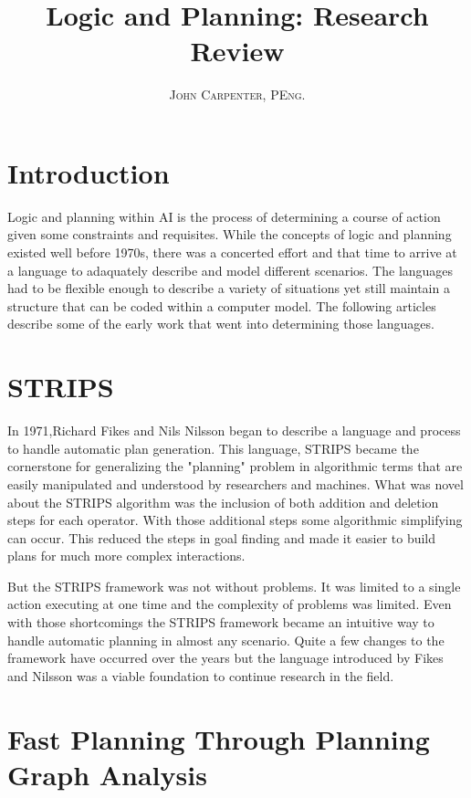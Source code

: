 \documentclass[paper=letter, fontsize=12pt]{article}
\title{\vspace{-15mm}\fontsize{24pt}{10pt}\selectfont\textbf{Logic and Planning: Research Review}} %
\author{
\large
{\textsc{John Carpenter, PEng.}}\\[2mm]}
\date{}
\begin{document}
\maketitle %
\section{Introduction}

Logic and planning within AI is the process of determining a course of action given some constraints and requisites. While the concepts of logic and planning existed well before 1970s, there was a concerted effort and that time to arrive at a language to adaquately describe and model different scenarios. The languages had to be flexible enough to describe a variety of situations yet still maintain a structure that can be coded within a computer model. The following articles describe some of the early work that went into determining those languages.

\section{STRIPS}

In 1971,Richard Fikes and Nils Nilsson\cite{fikesandnilsson1971} began to describe a language and process to handle automatic plan generation. This language, STRIPS became the cornerstone for generalizing the "planning" problem in algorithmic terms that are easily manipulated and understood by researchers and machines. What was novel about the STRIPS algorithm was the inclusion of both addition and deletion steps for each operator. With those additional steps some algorithmic simplifying can occur\cite{fikesandnilsson1993}. This reduced the steps in goal finding and made it easier to build plans for much more complex interactions.

But the STRIPS framework was not without problems. It was limited to a single action executing at one time and the complexity of problems was limited\cite{fikesandnilsson1993}. Even with those shortcomings the STRIPS framework became an intuitive way to handle automatic planning in almost any scenario. Quite a few changes to the framework have occurred over the years but the language introduced by Fikes and Nilsson was a viable foundation to continue research in the field.


\section{Fast Planning Through Planning Graph Analysis}
\end{document}
